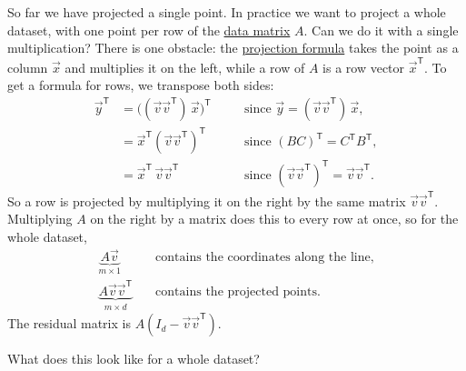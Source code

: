 \documentclass[a4paper,12pt,oneside]{report}
\begin{document}
So far we have projected a single point. In practice we want to
project a whole dataset, with one point per row of the
\hyperref[sec:data-matrix]{data matrix} $A$. Can we do it with a
single multiplication? There is one obstacle: the
\hyperref[def:projection-line]{projection formula} takes
the point as a column $\vec x$ and multiplies it on the left, while a
row of $A$ is a row vector $\vec x^{\mathsf T}$. To get a formula for
rows, we transpose both sides:
\[
\begin{aligned}
  \vec y^{\mathsf T}
    &=\bigl((\vec v\vec v^{\mathsf T})\,\vec x\bigr)^{\mathsf T}
    &&\quad\text{since } \vec y=(\vec v\vec v^{\mathsf T})\,\vec x,\\
    &=\vec x^{\mathsf T}(\vec v\vec v^{\mathsf T})^{\mathsf T}
    &&\quad\text{since } (BC)^{\mathsf T}=C^{\mathsf T}B^{\mathsf T},\\
    &=\vec x^{\mathsf T}\,\vec v\vec v^{\mathsf T}
    &&\quad\text{since } (\vec v\vec v^{\mathsf T})^{\mathsf T}
      =\vec v\vec v^{\mathsf T}.
\end{aligned}
\]
So a row is projected by multiplying it on the right by the same
matrix $\vec v\vec v^{\mathsf T}$. Multiplying $A$ on the right by a
matrix does this to every row at once, so for the whole dataset,
\[
\begin{aligned}
  \underbrace{A\vec v}_{m\times1}
     &\quad\text{contains the coordinates along the line},\\[6pt]
  \underbrace{A\vec v\vec v^{\mathsf T}}_{m\times d}
     &\quad\text{contains the projected points}.
\end{aligned}
\]
The residual matrix is $A(I_d-\vec v\vec v^{\mathsf T})$.

What does this look like for a whole dataset?
\end{document}
